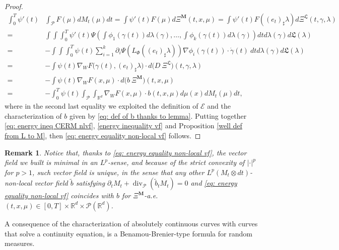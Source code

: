 \documentclass[10pt,leqno]{amsart}
\numberwithin{equation}{section}
\newtheorem{oss}[teorema]{Remark}
\newcommand{\R}{\mathbb{R}}
\newcommand{\PP}{\mathcal{P}}
\begin{document}
\begin{proof}
\begin{align*}
        \int_0^T \psi'(t) & \int_\PP F(\mu) dM_t(\mu) dt 
        =  
        \int \psi'(t) F(\mu) d\Xi^{\boldsymbol{M}}(t,x,\mu) 
        = 
        \int \psi'(t) F((e_t)_\sharp \lambda) d\Xi^{\mathfrak{L}}(t,\gamma,\lambda)  
        \\
        = &
        \int \int \int_0^T \psi'(t) \Psi\left(\int \phi_1(\gamma(t)) d\lambda(\gamma), \dots , \int \phi_k(\gamma(t)) d\lambda(\gamma)\right) dt d\lambda(\gamma) d\mathfrak{L}(\lambda) 
        \\
        = &
        - \int \int \int_0^T \psi(t) \sum_{i=1}^k \partial_i\Psi(L_\Phi((e_t)_\sharp \lambda)) \nabla\phi_i(\gamma(t)) \cdot \dot\gamma(t) \ dtd\lambda(\gamma) d\mathfrak{L}(\lambda)
        \\
        = & 
        - \int \psi(t) \nabla_W F \big(\gamma(t),(e_t)_\sharp \lambda\big) \cdot d\big(D \  \Xi^{\mathfrak{L}}\big)(t,\gamma,\lambda)
        \\
        = & 
        - \int \psi(t) \nabla_W F(x,\mu) \cdot d\big(b \ \Xi^{\boldsymbol{M}} \big)(t,x,\mu)
        \\
        = &
        - \int_0^T \psi(t) \int_\PP \int_{\R^d} \nabla_W F (x,\mu) \cdot b(t,x,\mu) d\mu(x) dM_t(\mu) dt,
    \end{align*}
    where in the second last equality we exploited the definition of $\mathcal{E}$ and the characterization of $b$ given by \eqref{eq: def of b thanks to lemma}. Putting together \eqref{eq: energy ineq CERM nlvf}, \eqref{energy inequality vf} and Proposition \eqref{well def from L to M}, then \eqref{eq: energy equality non-local vf} follows.
\end{proof}

\begin{oss}\label{rem: nlvf of minimal energy}
Notice that, thanks to \eqref{eq: energy equality non-local vf}, the vector field we built is minimal in an $L^p$-sense, and because of the strict convexity of $|\cdot |^p$ for $p>1$, such vector field is unique, in the sense that any other $L^p(M_t\otimes dt)$-non-local vector field $\tilde{b}$ satisfying $\partial_tM_t + \operatorname{div}_\PP(\tilde{b}_tM_t)=0$ and \eqref{eq: energy equality non-local vf} coincides with $b$ for $\Xi^{\boldsymbol{M}}$-a.e. $(t,x,\mu)\in[0,T]\times \R^d\times \PP(\R^d)$.
\end{oss}

A consequence of the characterization of absolutely continuous curves with curves that solve a continuity equation, is a Benamou-Brenier-type formula for random measures. 
\end{document}
